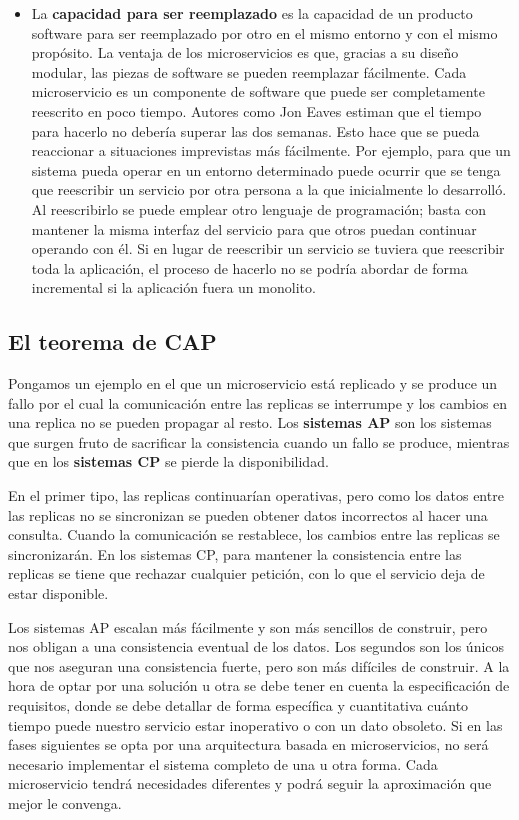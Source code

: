 \documentclass[11pt,spanish,listoffigures]{tfgetsinf}
\begin{document}
\begin{itemize}
\item La \textbf{capacidad para ser reemplazado} es la capacidad de un producto software para ser reemplazado por otro en el mismo entorno y con el mismo propósito. La ventaja de los microservicios es que, gracias a su diseño modular, las piezas de software se pueden reemplazar fácilmente. Cada microservicio es un componente de software que puede ser completamente reescrito en poco tiempo. Autores como Jon Eaves estiman que el tiempo para hacerlo no debería superar las dos semanas. Esto hace que se pueda reaccionar a situaciones imprevistas más fácilmente. Por ejemplo, para que un sistema pueda operar en un entorno determinado puede ocurrir que se tenga que reescribir un servicio por otra persona a la que inicialmente lo desarrolló. Al reescribirlo se puede emplear otro lenguaje de programación; basta con mantener la misma interfaz del servicio para que otros puedan continuar operando con él. \cite{Eaves2014} Si en lugar de reescribir un servicio se tuviera que reescribir toda la aplicación, el proceso de hacerlo no se podría abordar de forma incremental si la aplicación fuera un monolito.

\end{itemize}

\subsection{El teorema de CAP}

Pongamos un ejemplo en el que un microservicio está replicado y se produce un fallo por el cual la comunicación entre las replicas se interrumpe y los cambios en una replica no se pueden propagar al resto. Los \textbf{sistemas AP} son los sistemas que surgen fruto de sacrificar la consistencia cuando un fallo se produce, mientras que en los \textbf{sistemas CP} se pierde la disponibilidad. 

En el primer tipo, las replicas continuarían operativas, pero como los datos entre las replicas no se sincronizan se pueden obtener datos incorrectos al hacer una consulta. Cuando la comunicación se restablece, los cambios entre las replicas se sincronizarán. En los sistemas CP, para mantener la consistencia entre las replicas se tiene que rechazar cualquier petición, con lo que el servicio deja de estar disponible.

Los sistemas AP escalan más fácilmente y son más sencillos de construir, pero nos obligan a una consistencia eventual de los datos. Los segundos son los únicos que nos aseguran una consistencia fuerte, pero son más difíciles de construir. A la hora de optar por una solución u otra se debe tener en cuenta la especificación de requisitos, donde se debe detallar de forma específica y cuantitativa cuánto tiempo puede nuestro servicio estar inoperativo o con un dato obsoleto. Si en las fases siguientes se opta por una arquitectura basada en microservicios, no será necesario implementar el sistema completo de una u otra forma. Cada microservicio tendrá necesidades diferentes y podrá seguir la aproximación que mejor le convenga. \cite{Newman2015a}
\end{document}
